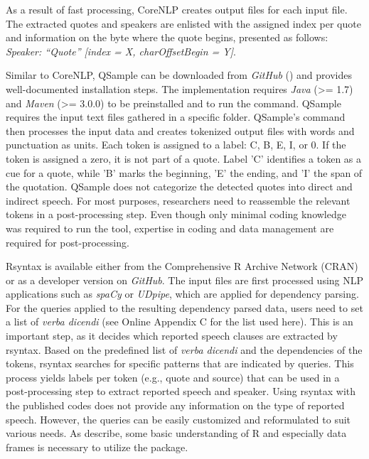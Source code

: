\documentclass{ccr}
\begin{document}
As a result of fast processing, CoreNLP creates output files for each input file. The extracted quotes and speakers are enlisted with the assigned index per quote and information on the byte where the quote begins, presented as follows: \textit{Speaker: ``Quote'' {[}index = X, charOffsetBegin = Y{]}}.

Similar to CoreNLP, QSample can be downloaded from \textit{GitHub}
(\cite{scheible2016model}) and provides well-documented installation steps.
The implementation requires \textit{Java} (\textgreater= 1.7) and
\textit{Maven} (\textgreater= 3.0.0) to be preinstalled and to run the
command. QSample requires the input text files gathered in a specific
folder. QSample's command then processes the input data and creates
tokenized output files with words and punctuation as units. Each token
is assigned to a label: C, B, E, I, or 0. If the token is assigned a
zero, it is not part of a quote. Label 'C' identifies a token as a cue for
a quote, while 'B' marks the beginning, 'E' the ending, and 'I' the span
of the quotation. QSample does not categorize the detected quotes into
direct and indirect speech. For most purposes, researchers need to
reassemble the relevant tokens in a post-processing step. Even though only
minimal coding knowledge was required to run the tool, expertise in
coding and data management are required for post-processing.

Rsyntax is available either from the Comprehensive R Archive Network
(CRAN) or as a developer version on \textit{GitHub}. The input files are
first processed using NLP applications such as \textit{spaCy} or \textit{UDpipe}, which are applied for dependency parsing. For the queries applied to the resulting dependency parsed data, users need to set a list of \textit{verba dicendi} (see Online Appendix C for the list used here). This is an important step, as it decides which reported speech clauses are extracted by rsyntax. Based on the predefined list of \textit{verba dicendi} and the dependencies of the tokens, rsyntax searches for specific patterns that are indicated by queries. This process yields labels per token (e.g., quote and source) that can be used in a post-processing step to extract reported speech and speaker. Using rsyntax with the published codes does not provide any information on the type of reported speech. However, the queries can be easily customized and reformulated to suit various needs. As \textcite{welbers2021extracting} describe, some basic understanding of R and especially data frames is necessary to utilize the package.
\end{document}
